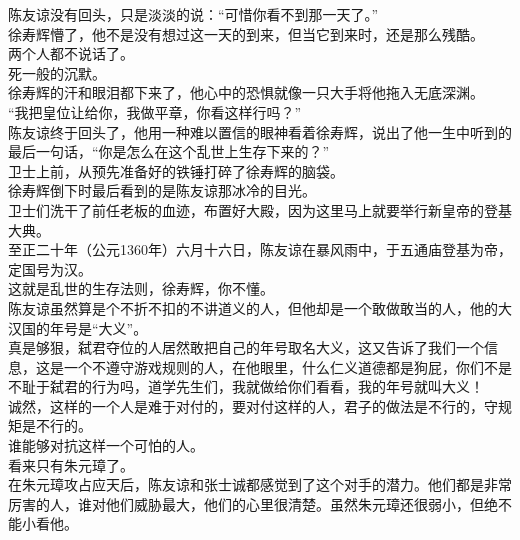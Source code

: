 \begin{multicols}{\theparacolNo}
陈友谅没有回头，只是淡淡的说：“可惜你看不到那一天了。”\\

徐寿辉懵了，他不是没有想过这一天的到来，但当它到来时，还是那么残酷。\\

两个人都不说话了。\\

死一般的沉默。\\

徐寿辉的汗和眼泪都下来了，他心中的恐惧就像一只大手将他拖入无底深渊。\\

“我把皇位让给你，我做平章，你看这样行吗？”\\

陈友谅终于回头了，他用一种难以置信的眼神看着徐寿辉，说出了他一生中听到的最后一句话，“你是怎么在这个乱世上生存下来的？”\\

卫士上前，从预先准备好的铁锤打碎了徐寿辉的脑袋。\\

徐寿辉倒下时最后看到的是陈友谅那冰冷的目光。\\

卫士们洗干了前任老板的血迹，布置好大殿，因为这里马上就要举行新皇帝的登基大典。\\

至正二十年（公元1360年）六月十六日，陈友谅在暴风雨中，于五通庙登基为帝，定国号为汉。\\

这就是乱世的生存法则，徐寿辉，你不懂。\\

陈友谅虽然算是个不折不扣的不讲道义的人，但他却是一个敢做敢当的人，他的大汉国的年号是“大义”。\\

真是够狠，弑君夺位的人居然敢把自己的年号取名大义，这又告诉了我们一个信息，这是一个不遵守游戏规则的人，在他眼里，什么仁义道德都是狗屁，你们不是不耻于弑君的行为吗，道学先生们，我就做给你们看看，我的年号就叫大义！\\

诚然，这样的一个人是难于对付的，要对付这样的人，君子的做法是不行的，守规矩是不行的。\\

谁能够对抗这样一个可怕的人。\\

看来只有朱元璋了。\\

在朱元璋攻占应天后，陈友谅和张士诚都感觉到了这个对手的潜力。他们都是非常厉害的人，谁对他们威胁最大，他们的心里很清楚。虽然朱元璋还很弱小，但绝不能小看他。\\


\end{multicols}
